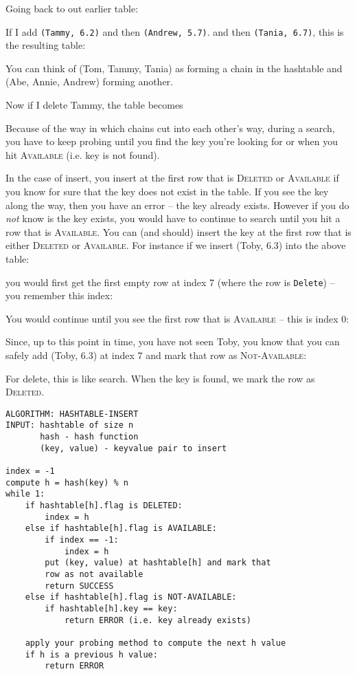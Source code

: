 Going back to out earlier table:


If I add 
\texttt{(Tammy, 6.2)}
and
then 
\texttt{(Andrew, 5.7)}.
and
then 
\texttt{(Tania, 6.7)},
this is the resulting table:



You can think of (Tom, Tammy, Tania) as forming a chain in the
hashtable and
(Abe, Annie, Andrew) forming another.

Now if I delete Tammy, the table becomes


Because of the way in which chains cut into each other's way,
during a search, you have to keep probing until you find the key you're
looking for or when you hit \textsc{Available} (i.e. key is not found).

In the case of insert, you insert at the first row that is
\textsc{Deleted}
or
\textsc{Available}
if you know for sure that the key does not exist in the table.
If you see the key along the way, then you have an error -- the
key already exists.
However if you do \textit{not} know is the key exists,
you would have to continue to search until you hit a
row that is \textsc{Available}.
You can (and should) insert the key at the first row that is
either \textsc{Deleted} or \textsc{Available}.
For instance if we insert (Toby, 6.3) into the above table:

you would first get the first empty row at index 7 (where
the row is \texttt{Delete}) -- you remember this index:


You would continue until you see the first row that is \textsc{Available}
-- this is index 0:


Since, up to this point in time, you have not seen Toby, you know
that you can safely add (Toby, 6.3) at index 7 and mark that row
as \textsc{Not-Available}:


For delete, this is like search.
When the key is found, we mark the row as \textsc{Deleted}.



\begin{Verbatim}[frame=single]
ALGORITHM: HASHTABLE-INSERT
INPUT: hashtable of size n
       hash - hash function
       (key, value) - keyvalue pair to insert

index = -1
compute h = hash(key) % n
while 1:
    if hashtable[h].flag is DELETED:
        index = h
    else if hashtable[h].flag is AVAILABLE:
        if index == -1:
            index = h
        put (key, value) at hashtable[h] and mark that
        row as not available
        return SUCCESS
    else if hashtable[h].flag is NOT-AVAILABLE:
        if hashtable[h].key == key:
            return ERROR (i.e. key already exists)
    
    apply your probing method to compute the next h value
    if h is a previous h value:
        return ERROR
\end{Verbatim}

